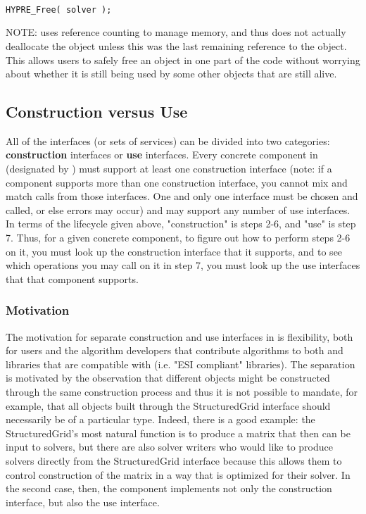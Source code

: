 \begin{enumerate}
\begin{display}
\begin{verbatim}

HYPRE_Free( solver );

\end{verbatim}
\end{display}

NOTE: \hypre{} uses reference counting to
manage memory, and 
thus  does not actually deallocate the object unless this was the
last remaining reference 
to the object. This allows users to safely free an object in one part of the
code without worrying about 
whether it is still being used by some other objects that are still alive.

\end{enumerate}

\subsection{Construction versus Use}

All of the \hypre{} interfaces (or sets of services) can be divided into two
categories: {\bf construction} 
interfaces or {\bf use} interfaces. Every concrete component in \hypre{} 
(designated by
) must support at 
least one construction interface (note: if a component supports more than one
construction interface, you 
cannot mix and match calls from those interfaces. One and only one interface
must be chosen and called, or 
else errors may occur) and may support any number of use interfaces. In terms
of the lifecycle given above, 
"construction" is steps 2-6, and "use" is step 7. Thus, for a given concrete
component, to figure out how to 
perform steps 2-6 on it, you must look up the \hypre{} construction interface that
it supports, and to see 
which operations you may call on it in step 7, you must look up the use
interfaces that that component 
supports.

\subsubsection{Motivation} The motivation for separate construction and use interfaces in
\hypre{} is flexibility, both for 
users and the algorithm developers that contribute algorithms to both \hypre{} and
libraries that are 
compatible with \hypre{} (i.e. "ESI compliant" libraries). The separation is
motivated by the observation 
that different objects might be constructed through the same construction
process and thus it is not possible 
to mandate, for example, that all objects built through the StructuredGrid
interface should necessarily be of 
a particular type. Indeed, there is a good example: the StructuredGrid's most
natural function is to produce 
a matrix that then can be input to solvers, but there are also solver writers
who would like to produce 
solvers directly from the StructuredGrid interface because this allows them to
control construction of the 
matrix in a way that is optimized for their solver. In the second case, then,
the component implements not only the 
 construction interface, but also the  use interface.

